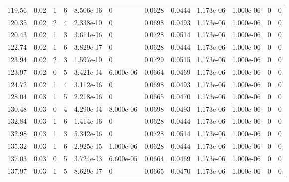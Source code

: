 \documentclass[preview]{standalone}
\begin{document}
{{{\begin{tabular}{L{1.2cm}C{1.2cm} C{0.3cm}C{0.5cm} C{1.4cm}C{1.4cm} C{1.4cm}C{1.4cm} C{1.6cm}C{1.6cm} C{1.6cm}C{1.6cm}}
  119.56  &  0.02  & 1     &  6 &  8.506e-06  & 0  &  0.0628&   0.0444& 1.173e-06 & 1.000e-06   &  0 & 0  \\ 
  120.35  &  0.02  & 2     &  4 &  2.338e-10  & 0  &  0.0698&   0.0493& 1.173e-06 & 1.000e-06   &  0 & 0  \\ 
  120.43  &  0.02  & 1     &  3 &  3.611e-06  & 0  &  0.0728&   0.0514& 1.173e-06 & 1.000e-06   &  0 & 0  \\ 
  122.74  &  0.02  & 1     &  6 &  3.829e-07  & 0  &  0.0628&   0.0444& 1.173e-06 & 1.000e-06   &  0 & 0  \\ 
  123.94  &  0.02  & 2     &  3 &  1.597e-10  & 0  &  0.0729&   0.0515& 1.173e-06 & 1.000e-06   &  0 & 0  \\ 
  123.97  &  0.02  & 0     &  5 &  3.421e-04  & 6.000e-06  &  0.0664&   0.0469& 1.173e-06 & 1.000e-06   &  0 & 0  \\ 
  124.72  &  0.02  & 1     &  4 &  3.112e-06  & 0  &  0.0698&   0.0493& 1.173e-06 & 1.000e-06   &  0 & 0  \\ 
  128.04  &  0.03  & 1     &  5 &  2.218e-06  & 0  &  0.0665&   0.0470& 1.173e-06 & 1.000e-06   &  0 & 0  \\ 
  130.48  &  0.03  & 0     &  4 &  4.290e-04  & 8.000e-06  &  0.0698&   0.0493& 1.173e-06 & 1.000e-06   &  0 & 0  \\ 
  132.84  &  0.03  & 1     &  6 &  1.414e-06  & 0  &  0.0628&   0.0444& 1.173e-06 & 1.000e-06   &  0 & 0  \\ 
  132.98  &  0.03  & 1     &  3 &  5.342e-06  & 0  &  0.0728&   0.0514& 1.173e-06 & 1.000e-06   &  0 & 0  \\ 
  135.32  &  0.03  & 1     &  6 &  2.925e-05  & 1.000e-06  &  0.0628&   0.0444& 1.173e-06 & 1.000e-06   &  0 & 0  \\ 
  137.03  &  0.03  & 0     &  5 &  3.724e-03  & 6.600e-05  &  0.0664&   0.0469& 1.173e-06 & 1.000e-06   &  0 & 0  \\ 
  137.97  &  0.03  & 1     &  5 &  8.629e-07  & 0  &  0.0665&   0.0470& 1.173e-06 & 1.000e-06   &  0 & 0  \\ 
\hline 
\end{tabular} 

}}}
\end{document}
